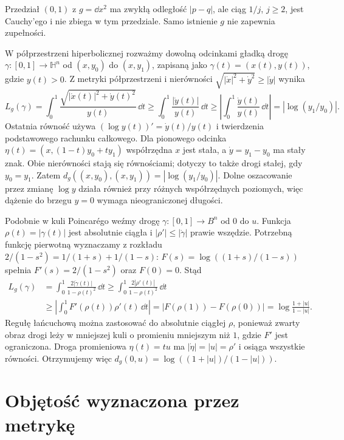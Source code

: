 \begin{przyklad}
Przedział $(0,1)$ z $g=\dd x^2$ ma zwykłą
odległość $|p-q|$, ale ciąg $1/j$, $j\geq2$, jest
Cauchy'ego i nie zbiega w tym przedziale.
Samo istnienie $g$ nie zapewnia zupełności.

W półprzestrzeni hiperbolicznej rozważmy dowolną
odcinkami gładką drogę $\gamma:[0,1]\to\mathbb H^n$
od $(x,y_0)$ do $(x,y_1)$, zapisaną jako
$\gamma(t)=(x(t),y(t))$, gdzie $y(t)>0$.
Z metryki półprzestrzeni i nierówności
$\sqrt{|\dot x|^2+\dot y^2}\geq|\dot y|$ wynika
\[
 L_g(\gamma)
 =\int_0^1\frac{\sqrt{|\dot x(t)|^2+\dot y(t)^2}}{y(t)}\,\dd t
 \geq\int_0^1\frac{|\dot y(t)|}{y(t)}\,\dd t
 \geq\left|\int_0^1\frac{\dot y(t)}{y(t)}\,\dd t\right|
 =|\log(y_1/y_0)|.
\]
Ostatnia równość używa
$(\log y(t))'=\dot y(t)/y(t)$ i twierdzenia podstawowego
rachunku całkowego. Dla pionowego odcinka
$\eta(t)=(x,(1-t)y_0+ty_1)$ współrzędna $x$ jest stała,
a $\dot y=y_1-y_0$ ma stały znak. Obie nierówności stają
się równościami; dotyczy to także drogi stałej, gdy $y_0=y_1$.
Zatem $d_g((x,y_0),(x,y_1))=|\log(y_1/y_0)|$.
Dolne oszacowanie przez zmianę $\log y$ działa również
przy różnych współrzędnych poziomych, więc dążenie do
brzegu $y=0$ wymaga nieograniczonej długości.

Podobnie w kuli Poincarégo weźmy drogę
$\gamma:[0,1]\to B^n$ od $0$ do $u$.
Funkcja
$\rho(t)=|\gamma(t)|$ jest absolutnie ciągła
i $|\rho'|\leq|\dot\gamma|$ prawie wszędzie.
Potrzebną funkcję pierwotną wyznaczamy z rozkładu
$2/(1-s^2)=1/(1+s)+1/(1-s)$:
$F(s)=\log((1+s)/(1-s))$ spełnia $F'(s)=2/(1-s^2)$
oraz $F(0)=0$. Stąd
\[
 \begin{aligned}
 L_g(\gamma)
 &=\int_0^1\frac{2|\dot\gamma(t)|}{1-\rho(t)^2}\,\dd t
 \geq\int_0^1\frac{2|\rho'(t)|}{1-\rho(t)^2}\,\dd t\\
 &\geq\left|\int_0^1 F'(\rho(t))\rho'(t)\,\dd t\right|
 =|F(\rho(1))-F(\rho(0))|
 =\log\frac{1+|u|}{1-|u|}.
 \end{aligned}
\]
Regułę łańcuchową można zastosować do absolutnie ciągłej
$\rho$, ponieważ zwarty obraz drogi leży w mniejszej kuli
o promieniu mniejszym niż $1$, gdzie $F'$ jest ograniczona.
Droga promieniowa $\eta(t)=tu$ ma
$|\dot\eta|=|u|=\rho'$ i osiąga wszystkie równości.
Otrzymujemy więc $d_g(0,u)=\log((1+|u|)/(1-|u|))$.
\end{przyklad}

\section{Objętość wyznaczona przez metrykę}
\label{sec:metryka-objetosc}

